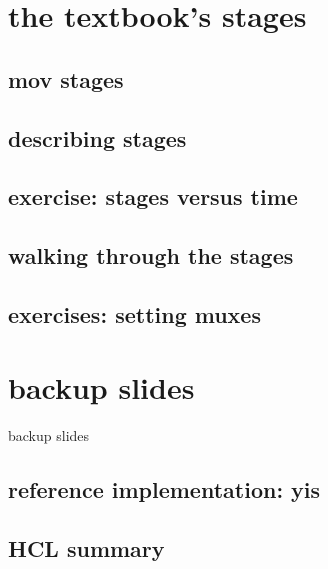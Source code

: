 \section{the textbook's stages}

\subsection{mov stages}



\subsection{describing stages}



\subsection{exercise: stages versus time}



\subsection{walking through the stages}



\subsection{exercises: setting muxes}


\section{backup slides}
\begin{frame}{backup slides}
\end{frame}

\subsection{reference implementation: yis}


\subsection{HCL summary}


